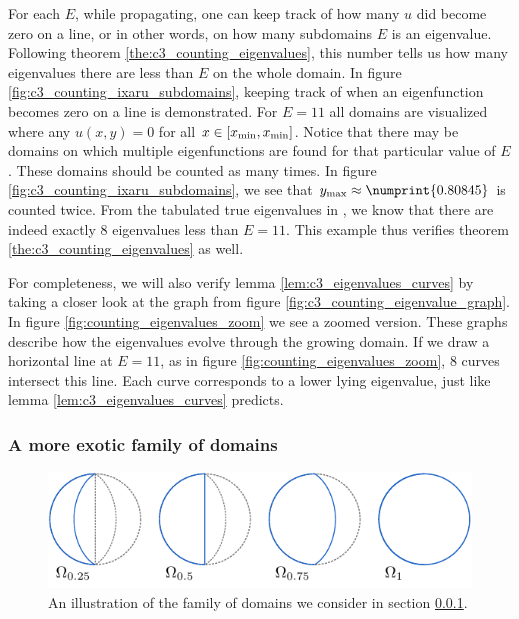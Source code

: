 For each $E$, while propagating, one can keep track of how many $u$ did become zero on a line, or in other words, on how many subdomains $E$ is an eigenvalue. Following theorem \ref{the:c3_counting_eigenvalues}, this number tells us how many eigenvalues there are less than $E$ on the whole domain. In figure \ref{fig:c3_counting_ixaru_subdomains}, keeping track of when an eigenfunction becomes zero on a line is demonstrated. For $E = 11$ all domains are visualized where any $u(x, y) = 0$ for all $x \in [{x_{\text{min}}}, {x_{\text{min}}}]$. Notice that there may be domains on which multiple eigenfunctions are found for that particular value of $E$. These domains should be counted as many times. In figure \ref{fig:c3_counting_ixaru_subdomains}, we see that $\ymax \approx \numprint{0.80845}$ is counted twice. From the tabulated true eigenvalues in \cite{ixaru_new_2010}, we know that there are indeed exactly $8$ eigenvalues less than $E = 11$. This example thus verifies theorem \ref{the:c3_counting_eigenvalues} as well.

For completeness, we will also verify lemma \ref{lem:c3_eigenvalues_curves} by taking a closer look at the graph from figure \ref{fig:c3_counting_eigenvalue_graph}. In figure \ref{fig:counting_eigenvalues_zoom} we see a zoomed version. These graphs describe how the eigenvalues evolve through the growing domain. If we draw a horizontal line at $E = 11$, as in figure \ref{fig:counting_eigenvalues_zoom}, $8$ curves intersect this line. Each curve corresponds to a lower lying eigenvalue, just like lemma \ref{lem:c3_eigenvalues_curves} predicts.


\subsubsection{A more exotic family of domains}\label{sec:c3_counting_exotic_domain}

\begin{figure}
  \begin{center}
    \includegraphics[width=\linewidth]{img/chapter3/counting/moons.pdf}
    \caption{An illustration of the family of domains we consider in section \ref{sec:c3_counting_exotic_domain}.}\label{fig:c3_counting_visual_moons}
  \end{center}
\end{figure}

